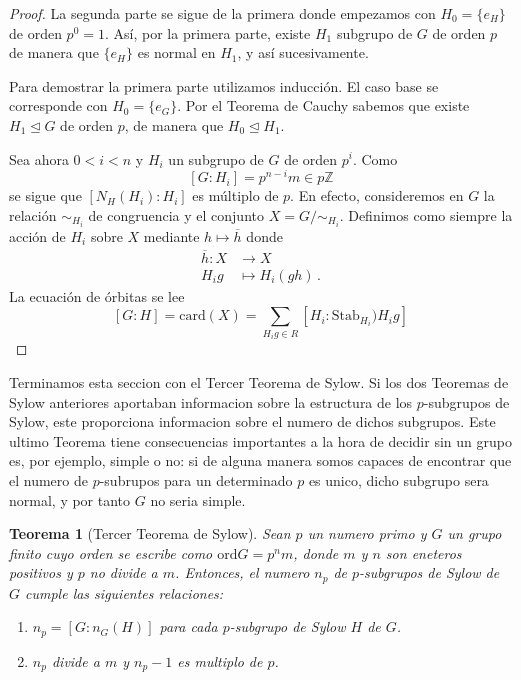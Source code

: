 \documentclass[a4paper,11pt]{amsart}
\theoremstyle{plain}
\newtheorem{thm}{Teorema}[section]
\theoremstyle{definition}
\theoremstyle{remark}
\begin{document}
\begin{proof}
La segunda parte se sigue de la primera donde empezamos con $H_0 = \{e_H\}$ de orden $p^0 = 1$. Así, por la primera parte, existe $H_1$ subgrupo de $G$ de orden $p$ de manera que $\{e_H\}$ es normal en $H_1$, y así sucesivamente. 

Para demostrar la primera parte utilizamos inducción. El caso base se corresponde con $H_0 = \{e_G\}$. Por el Teorema de Cauchy sabemos que existe $H_1 \unlhd G$ de orden $p$, de manera que $H_0 \trianglelefteq H_1$. 

Sea ahora $0 < i < n$ y $H_i$ un subgrupo de $G$ de orden $p^i$. Como 
\[ [G : H_i] = p^{n-i} m \in p \mathbb{Z} \]
se sigue que $[N_H(H_i) : H_i ]$ es múltiplo de $p$. En efecto, consideremos en $G$ la relación $\sim_{H_i}$ de congruencia y el conjunto $X = G/\sim_{H_i}$. Definimos como siempre la acción de $H_i$ sobre $X$ mediante $h \mapsto \overline{h}$ donde 
\begin{align*}
    \overline{h} \colon X & \to X \\
    H_ig & \mapsto H_i(gh) \, .
\end{align*}
La ecuación de órbitas se lee 
\[ [G:H] = \text{card}(X) = \sum_{H_ig \in R} [H_i : \text{Stab}_{H_i})H_ig]\]
\end{proof}

Terminamos esta seccion con el Tercer Teorema de Sylow. Si los dos Teoremas de Sylow anteriores aportaban informacion sobre la estructura de los $p$-subgrupos de Sylow, este proporciona informacion sobre el numero de dichos subgrupos. Este ultimo Teorema tiene consecuencias importantes a la hora de decidir sin un grupo es, por ejemplo, simple o no: si de alguna manera somos capaces de encontrar que el numero de $p$-subrupos para un determinado $p$ es unico, dicho subgrupo sera normal, y por tanto $G$ no seria simple. 


\begin{thm}[Tercer Teorema de Sylow]
Sean $p$ un numero primo y $G$ un grupo finito cuyo orden se escribe como $\text{ord}{G} = p^n m$, donde $m$ y $n$ son eneteros positivos y $p$ no divide a $m$. Entonces, el numero $n_p$ de $p$-subgrupos de Sylow de $G$ cumple las siguientes relaciones:
\begin{enumerate}
    \item $n_p = [G : n_G(H)]$ para cada $p$-subgrupo de Sylow $H$ de $G$.
    \item $n_p$ divide a $m$ y $n_p - 1$ es multiplo de $p$. 
\end{enumerate}
\end{thm}
\end{document}
